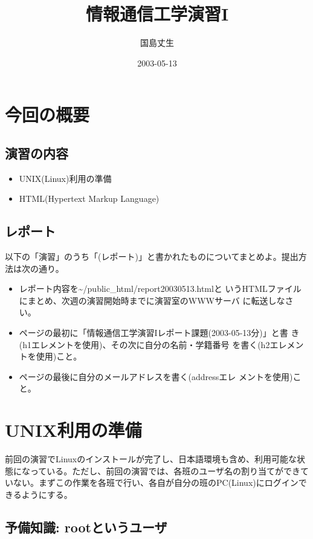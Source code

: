 \documentclass[a4j,10pt]{jarticle}
\begin{document}
\title{情報通信工学演習I}
\author{国島丈生}
\date{2003-05-13}
\maketitle

\section{今回の概要}
\subsection{演習の内容}
\begin{itemize}
 \item UNIX(Linux)利用の準備
 \item HTML(Hypertext Markup Language)
\end{itemize}

\subsection{レポート}
以下の「演習」のうち「(レポート)」と書かれたものについてまとめよ。提出方
法は次の通り。
\begin{itemize}
 \item レポート内容を{\sffamily \~{}/public\_html/report20030513.html}と
       いうHTMLファイルにまとめ、次週の演習開始時までに演習室のWWWサーバ
       に転送しなさい。
 \item ページの最初に「情報通信工学演習Iレポート課題(2003-05-13分)」と書
       き({\sffamily h1}エレメントを使用)、その次に自分の名前・学籍番号
       を書く({\sffamily h2エレメントを使用})こと。
 \item ページの最後に自分のメールアドレスを書く({\sffamily address}エレ
       メントを使用)こと。
\end{itemize}

\clearpage

\section{UNIX利用の準備}

前回の演習でLinuxのインストールが完了し、日本語環境も含め、利用可能な状
態になっている。ただし、前回の演習では、各班のユーザ名の割り当てができて
いない。まずこの作業を各班で行い、各自が自分の班のPC(Linux)にログインで
きるようにする。

\subsection{予備知識: rootというユーザ}
\end{document}
